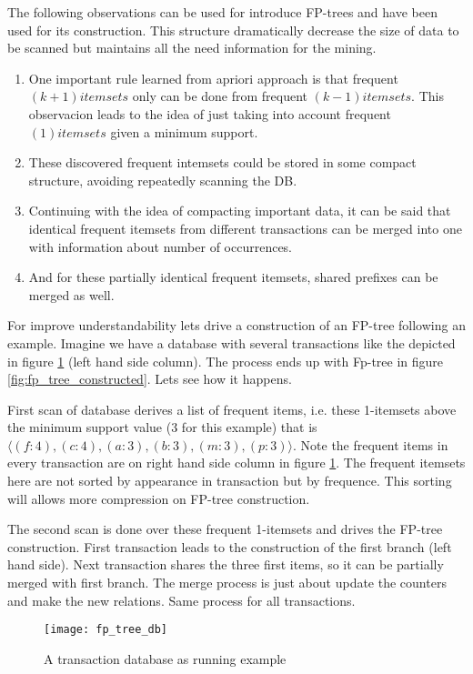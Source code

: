 The following observations can be used for introduce FP-trees and have been used
for its construction. This structure dramatically decrease the size of data to be 
scanned but maintains all the need information for the mining.

\begin{enumerate}[label=\roman*)]
  \item One important rule learned from apriori approach is that frequent
    $(k+1) itemsets$ only can be done from frequent $(k-1) itemsets$. This observacion
    leads to the idea of just taking into account frequent $(1) itemsets$ given a
    minimum support.
  \item These discovered frequent intemsets could be stored in some compact
    structure, avoiding repeatedly scanning the DB.
  \item Continuing with the idea of compacting important data, it can be said
    that identical frequent itemsets from different transactions can be merged
    into one with information about number of occurrences.
  \item And for these partially identical frequent itemsets, shared prefixes can
    be merged as well.
\end{enumerate}

For improve understandability lets drive a construction of an FP-tree following an
example. Imagine we have a database with several transactions like the depicted
in figure \ref{fig:fp_tree_db} (left hand side column). The process ends up with
Fp-tree in figure \ref{fig:fp_tree_constructed}. Lets see how it happens. 

First scan of database derives a list of frequent items, i.e. these 1-itemsets 
above the minimum support value (3 for this example) that is $\langle
(f:4),(c:4),(a:3),(b:3),(m:3),(p:3) \rangle$. Note the frequent items in every
transaction are on right hand side column in figure \ref{fig:fp_tree_db}. The
frequent itemsets here are not sorted by appearance in transaction but by
frequence. This sorting will allows more compression on FP-tree construction.

The second scan is done over these frequent 1-itemsets and drives the
FP-tree construction. First transaction leads to the construction of the first
branch (left hand side). Next transaction shares the three first items, so
it can be partially merged with first branch. The merge process is just about
update the counters and make the new relations. Same process for all
transactions.

\begin{figure}
  \centering
  \texttt{[image: fp\_tree\_db]}
  \caption{A transaction database as running example}
  \label{fig:fp_tree_db}
\end{figure}

